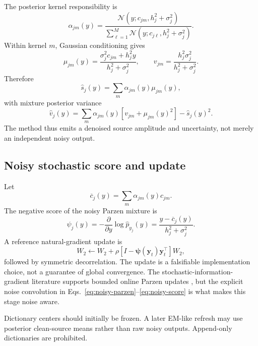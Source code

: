 \documentclass[11pt]{article}
\newcommand{\N}{\mathcal N}
\begin{document}
The posterior kernel responsibility is
\begin{equation}
\alpha_{jm}(y)=
\frac{\N(y;c_{jm},h_j^2+\sigma_j^2)}
{\sum_{\ell=1}^{M}\N(y;c_{j\ell},h_j^2+\sigma_j^2)}.
\end{equation}
Within kernel \(m\), Gaussian conditioning gives
\begin{equation}
\mu_{jm}(y)=
\frac{\sigma_j^2c_{jm}+h_j^2y}{h_j^2+\sigma_j^2},
\qquad
v_{jm}=
\frac{h_j^2\sigma_j^2}{h_j^2+\sigma_j^2}.
\end{equation}
Therefore
\begin{equation}
\widehat s_j(y)=
\sum_m\alpha_{jm}(y)\mu_{jm}(y),
\label{eq:posterior-mean}
\end{equation}
with mixture posterior variance
\begin{equation}
\widehat v_j(y)=
\sum_m\alpha_{jm}(y)
\left[v_{jm}+\mu_{jm}(y)^2\right]
-\widehat s_j(y)^2.
\label{eq:posterior-var}
\end{equation}
The method thus emits a denoised source amplitude and uncertainty, not merely an
independent noisy output.

\subsection{Noisy stochastic score and update}

Let
\begin{equation}
\overline c_j(y)=\sum_m\alpha_{jm}(y)c_{jm}.
\end{equation}
The negative score of the noisy Parzen mixture is
\begin{equation}
\psi_j(y)=
-\frac{\partial}{\partial y}\log\widehat p_{y_j}(y)
=
\frac{y-\overline c_j(y)}{h_j^2+\sigma_j^2}.
\label{eq:noisy-score}
\end{equation}
A reference natural-gradient update is
\begin{equation}
W_2\leftarrow
W_2+\rho
\left[I-\bm\psi(\bm y_t)\bm y_t^\top\right]W_2,
\label{eq:natural-update}
\end{equation}
followed by symmetric decorrelation. The update is a falsifiable implementation
choice, not a guarantee of global convergence. The stochastic-information-
gradient literature supports bounded online Parzen updates
\cite{erdogmus2003sig,yang2007}, but the explicit noise convolution in
Eqs.~\eqref{eq:noisy-parzen}--\eqref{eq:noisy-score} is what makes this stage
noise aware.

Dictionary centers should initially be frozen. A later EM-like refresh may use
posterior clean-source means rather than raw noisy outputs. Append-only
dictionaries are prohibited.
\end{document}
